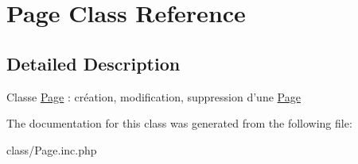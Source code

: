 \hypertarget{class_page}{
\section{Page Class Reference}
\label{class_page}
}


\subsection{Detailed Description}
Classe \hyperlink{class_page}{Page} : création, modification, suppression d'une \hyperlink{class_page}{Page} 

The documentation for this class was generated from the following file:\begin{DoxyCompactItemize}
\item 
class/Page.inc.php\end{DoxyCompactItemize}
